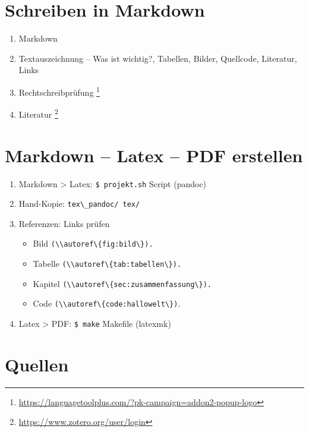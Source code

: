 \section{Schreiben in Markdown}\label{schreiben-in-markdown}

\begin{enumerate}
\item
  Markdown
\item
  Textauszeichnung -- Was ist wichtig?, Tabellen, Bilder, Quellcode,
  Literatur, Links
\item
  Rechtschreibprüfung \footnote{\url{https://languagetoolplus.com/?pk-campaign=addon2-popup-logo}}
\item
  Literatur \footnote{\url{https://www.zotero.org/user/login}}
\end{enumerate}

\section{Markdown -- Latex -- PDF
erstellen}\label{markdown-latex-pdf-erstellen}

\begin{enumerate}
\item
  Markdown > Latex: \verb|$ projekt.sh|
  Script (pandoc)
\item
  Hand-Kopie: \verb|tex\_pandoc/ tex/|
\item
  Referenzen: Links prüfen

  \begin{itemize}
  \item
    Bild %
    \verb|(\\autoref\{fig:bild\}).|
  \item
    Tabelle %
    \verb|(\\autoref\{tab:tabellen\}).|
  \item
    Kapitel %
    \verb|(\\autoref\{sec:zusammenfassung\}).|
  \item
    Code %
    \verb|(\\autoref\{code:hallowelt\})|.
  \end{itemize}
\item
  Latex > PDF: \verb|$ make| Makefile
  (latexmk)
\end{enumerate}

\section{Quellen}\label{quellen}

